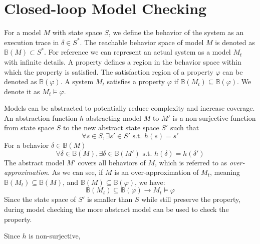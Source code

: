 \section{Closed-loop Model Checking}
For a model $M$ with state space $S$, we define the behavior of the system as an execution trace in $\delta\in S^*$. The reachable behavior space of model $M$ is denoted as $\mathbb{B}(M)\subset S^*$. For reference we can represent an actual system as a model $M_t$ with infinite details. A property defines a region in the behavior space within which the property is satisfied. The satisfaction region of a property $\varphi$ can be denoted as $\mathbb{B}(\varphi)$. A system $M_t$ satisfies a property $\varphi$ if $\mathbb{B}(M_t)\subseteq \mathbb{B}(\varphi)$. We denote it as $M_t\models\varphi$. 

Models can be abstracted to potentially reduce complexity and increase coverage. An abstraction function $h$ abstracting model $M$ to $M'$ is a non-surjective function from state space $S$ to the new abstract state space $S'$ such that 
$$\forall s\in S, \exists s'\in S' \text{ s.t. } h(s)=s'$$
For a behavior $\delta\in \mathbb{B}(M)$
$$\forall \delta\in \mathbb{B}(M),\exists \delta\in\mathbb{B}(M')\text{ s.t. } h(\delta)=h(\delta')$$
The abstract model $M'$ covers all behaviors of $M$, which is referred to as \emph{over-approximation}. 
As we can see, if $M$ is an over-approximation of $M_t$, meaning $\mathbb{B}(M_t)\subseteq \mathbb{B}(M)$, and $\mathbb{B}(M)\subseteq \mathbb{B}(\varphi)$, we have:
 $$\mathbb{B}(M_t)\subseteq \mathbb{B}(\varphi)\rightarrow M_t\models\varphi$$ 
Since the state space of $S'$ is smaller than $S$ while still preserve the property, during model checking the more abstract model can be used to check the property. 

Since $h$ is non-surjective, 



